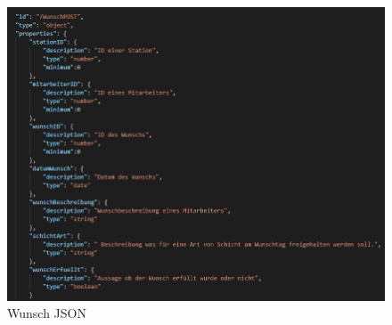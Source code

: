 \documentclass[11pt,
paper=a4,
bibtotocnumbered,	  %
liststotocnumbered,  %
DIV=calc,		  %
tablecaptionabove,	  %
headinclude,
]{article}
\begin{document}
\begin{figure}[H]
\includegraphics[width=1\textwidth]{Bilder/validWunsch.jpg}
\caption{Wunsch JSON}
\end{figure}
\end{document}
